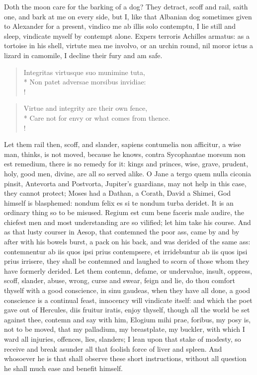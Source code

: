 {Doth the moon care for the barking of a dog? They detract, scoff and
rail, saith one, and bark at me on every side, but I, like that
Albanian dog sometimes given to Alexander for a present, vindico me ab
illis solo contemptu, I lie still and sleep, vindicate myself by
contempt alone. Expers terroris Achilles armatus: as a tortoise
in his shell, virtute mea me involvo, or an urchin round, nil
moror ictus a lizard in camomile, I decline their fury and am
safe.
%
\begin{latin}%
\begin{verse}%
Integritas virtusque suo munimine tuta,\\*
Non patet adversae morsibus invidiae:\\!
\end{verse}%
\end{latin}%
\translationrule%
\begin{verse}%
Virtue and integrity are their own fence,\\*
Care not for envy or what comes from thence.\\!
\end{verse}%
%
Let them rail then, scoff, and slander, sapiens contumelia non
afficitur, a wise man, \Seneca thinks, is not moved, because he knows,
contra Sycophantae morsum non est remedium, there is no remedy for it:
kings and princes, wise, grave, prudent, holy, good men, divine, are
all so served alike. O Jane a tergo quem nulla ciconia pinsit,
Antevorta and Postvorta, Jupiter's guardians, may not help in this
case, they cannot protect; Moses had a Dathan, a Corath, David a
Shimei, God himself is blasphemed: nondum felix es si te nondum turba
deridet. It is an ordinary thing so to be misused. Regium est cum
bene faceris male audire, the chiefest men and most understanding are
so vilified; let him take his course. And as that lusty courser
in Aesop, that contemned the poor ass, came by and by after with his
bowels burst, a pack on his back, and was derided of the same ass:
contemnentur ab iis quos ipsi prius contempsere, et irridebuntur ab iis
quos ipsi prius irrisere, they shall be contemned and laughed to scorn
of those whom they have formerly derided. Let them contemn, defame, or
undervalue, insult, oppress, scoff, slander, abuse, wrong, curse and
swear, feign and lie, do thou comfort thyself with a good conscience,
in sinu gaudeas, when they have all done, a good conscience is a
continual feast, innocency will vindicate itself: and which the poet
gave out of Hercules, diis fruitur iratis, enjoy thyself, though all
the world be set against thee, contemn and say with him, Elogium mihi
prae, foribus, my posy is, not to be moved, that my palladium, my
breastplate, my buckler, with which I ward all injuries, offences,
lies, slanders; I lean upon that stake of modesty, so receive and break
asunder all that foolish force of liver and spleen. And whosoever he is
that shall observe these short instructions, without all question he
shall much ease and benefit himself.

}
